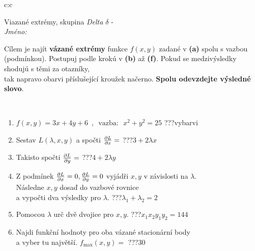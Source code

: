 \documentclass[10pt]{report}
\begin{document}
\begin{tabular}{c:c}
\begin{minipage}[c][104.5mm][t]{0.5\linewidth}
\begin{center}
\vspace{7mm}
{\huge Viazané extrémy, skupina \textit{Delta $\delta$} -}\\[5mm]
\textit{Jméno:}\phantom{xxxxxxxxxxxxxxxxxxxxxxxxxxxxxxxxxxxxxxxxxxxxxxxxxxxxxxxxxxxxxxxxx}\\[5mm]
\begin{minipage}{0.95\linewidth}
\begin{center}
Cílem je najít \textbf{vázané extrémy} funkce $f(x,y)$ zadané v \textbf{(a)} spolu s vazbou (podmínkou). Postupuj podle krokú v \textbf{(b)} až \textbf{(f)}. Pokud se medzivýsledky shodujú s těmi za otazníky,\\tak napravo obarvi příslušející kroužek načerno. \textbf{Spolu odevzdejte výsledné slovo}.
\end{center}
\end{minipage}
\\[1mm]
\begin{minipage}{0.79\linewidth}
\begin{center}
\begin{varwidth}{\linewidth}
\begin{enumerate}
\normalsize
\item $f(x,y)=3x+4y+6 \enspace , \enspace \mathrm{vazba:} \enspace x^2+y^2=25$\quad \dotfill\; ???\;\dotfill \quad vybarvi
\item Sestav $L(\lambda,x,y)$ a spočti $\pdv{L}{x}=$\quad \dotfill\; ???\;\dotfill \quad $3+2\lambda x$
\item Takisto spočti $\pdv{L}{y}=$\quad \dotfill\; ???\;\dotfill \quad $4+2\lambda y$
\item Z podmínek $\pdv{L}{x}=0 , \pdv{L}{y}=0$ vyjádři $x,y$ v závislosti na $\lambda$.\\ \phantom{xxxxxx}Následne $x,y$ dosaď do vazbové rovnice\\ \phantom{xxxxxx}a vypočti dva výsledky pro $\lambda$.\quad \dotfill\; ???\;\dotfill \quad $\lambda_1+\lambda_2=2$
\item Pomocou $\lambda$ urč dvě dvojice pro $x,y$.\quad \dotfill\; ???\;\dotfill \quad $x_1 x_2 y_1 y_2=144$
\item Najdi funkční hodnoty pro oba vázané stacionární body\\ \phantom{xxxxxx}a vyber tu najvětší. $f_{\text{max}}(x,y)=$\quad \dotfill\; ???\;\dotfill \quad $30$

\end{enumerate}
\end{varwidth}
\end{center}
\end{minipage}
\end{center}
\end{minipage}
\end{tabular}
\end{document}
